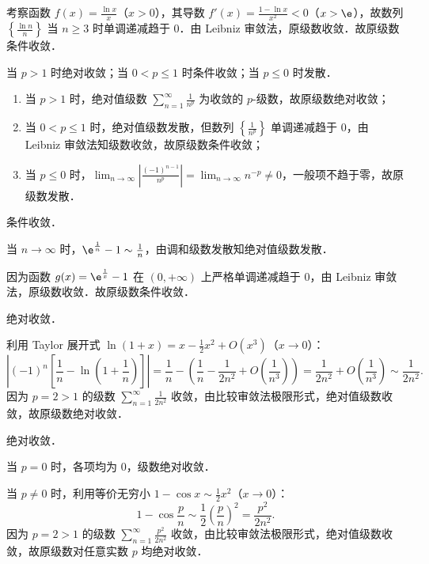 \begin{solution}
    考察函数 $f(x) = \frac{\ln x}{x}$（$x > 0$），其导数 $f'(x) = \frac{1 - \ln x}{x^2} < 0$（$x > \e$），故数列 $\left\{\frac{\ln n}{n}\right\}$ 当 $n \geqslant 3$ 时单调递减趋于 $0$．由 Leibniz 审敛法，原级数收敛．故原级数条件收敛．

     当 $p > 1$ 时绝对收敛；当 $0 < p \leqslant 1$ 时条件收敛；当 $p \leqslant 0$ 时发散．

    \begin{enumerate}
        \item 当 $p > 1$ 时，绝对值级数 $\sum_{n=1}^\infty \frac{1}{n^p}$ 为收敛的 $p$-级数，故原级数绝对收敛；
        \item 当 $0 < p \leqslant 1$ 时，绝对值级数发散，但数列 $\left\{\frac{1}{n^p}\right\}$ 单调递减趋于 $0$，由 Leibniz 审敛法知级数收敛，故原级数条件收敛；
        \item 当 $p \leqslant 0$ 时，$\lim_{n\to\infty} \left|\frac{(-1)^{n-1}}{n^p}\right| = \lim_{n\to\infty} n^{-p} \neq 0$，一般项不趋于零，故原级数发散．
    \end{enumerate}

     条件收敛．

    当 $n \to \infty$ 时，$\e^{\frac{1}{n}} - 1 \sim \frac{1}{n}$，由调和级数发散知绝对值级数发散．

    因为函数 $g(x) = \e^{\frac{1}{x}} - 1$ 在 $(0, +\infty)$ 上严格单调递减趋于 $0$，由 Leibniz 审敛法，原级数收敛．故原级数条件收敛．

     绝对收敛．

    利用 Taylor 展开式 $\ln(1 + x) = x - \frac{1}{2}x^2 + O(x^3)$（$x \to 0$）：
    \begin{equation}
        \left| (-1)^n \left[ \frac{1}{n} - \ln\left(1 + \frac{1}{n}\right) \right] \right| = \frac{1}{n} - \left(\frac{1}{n} - \frac{1}{2n^2} + O\left(\frac{1}{n^3}\right)\right) = \frac{1}{2n^2} + O\left(\frac{1}{n^3}\right) \sim \frac{1}{2n^2}.
    \end{equation}
    因为 $p = 2 > 1$ 的级数 $\sum_{n=1}^\infty \frac{1}{2n^2}$ 收敛，由比较审敛法极限形式，绝对值级数收敛，故原级数绝对收敛．

     绝对收敛．

    当 $p = 0$ 时，各项均为 $0$，级数绝对收敛．

    当 $p \neq 0$ 时，利用等价无穷小 $1 - \cos x \sim \frac{1}{2}x^2$（$x \to 0$）：
    \begin{equation}
        1 - \cos \frac{p}{n} \sim \frac{1}{2}\left(\frac{p}{n}\right)^2 = \frac{p^2}{2n^2}.
    \end{equation}
    因为 $p = 2 > 1$ 的级数 $\sum_{n=1}^\infty \frac{p^2}{2n^2}$ 收敛，由比较审敛法极限形式，绝对值级数收敛，故原级数对任意实数 $p$ 均绝对收敛．


\end{solution}
